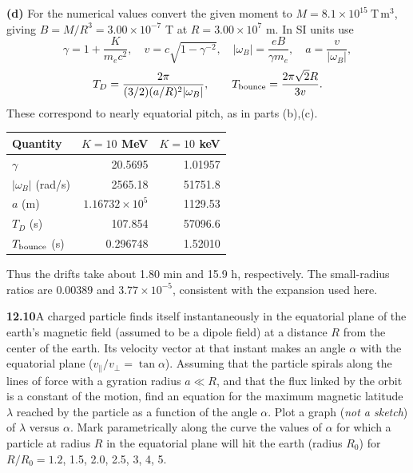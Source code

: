 \medskip\noindent\textbf{(d)} For the numerical values convert the given moment to
$M=8.1\times10^{15}\ \mathrm{T\,m^3}$, giving
$B=M/R^3=3.00\times10^{-7}$ T at $R=3.00\times10^7$ m.
In SI units use
\[
\gamma=1+\frac{K}{m_ec^2},\quad
v=c\sqrt{1-\gamma^{-2}},\quad
|\omega_B|=\frac{eB}{\gamma m_e},\quad a=\frac v{|\omega_B|},
\]
\[
T_D=\frac{2\pi}{(3/2)(a/R)^2|\omega_B|},\qquad
T_{\rm bounce}=\frac{2\pi\sqrt2R}{3v}.
\]
These correspond to nearly equatorial pitch, as in parts (b),(c).
\begin{center}
\begin{tabular}{lrr}
\toprule
Quantity&$K=10$ MeV&$K=10$ keV\\
\midrule
$\gamma$&20.5695&1.01957\\
$|\omega_B|$ (rad/s)&2565.18&51751.8\\
$a$ (m)&$1.16732\times10^5$&1129.53\\
$T_D$ (s)&107.854&57096.6\\
$T_{\rm bounce}$ (s)&0.296748&1.52010\\
\bottomrule
\end{tabular}
\end{center}
Thus the drifts take about 1.80 min and 15.9 h, respectively.
The small-radius ratios are $0.00389$ and $3.77\times10^{-5}$,
consistent with the expansion used here.

\par\bigskip
\noindent\textbf{12.10}\quad A charged particle finds itself instantaneously in the equatorial plane of the earth's magnetic field (assumed to be a dipole field) at a distance $R$ from the center of the earth. Its velocity vector at that instant makes an angle $\alpha$ with the equatorial plane ($v_{\parallel}/v_{\perp}=\tan\alpha$). Assuming that the particle spirals along the lines of force with a gyration radius $a\ll R$, and that the flux linked by the orbit is a constant of the motion, find an equation for the maximum magnetic latitude $\lambda$ reached by the particle as a function of the angle $\alpha$. Plot a graph (\emph{not a sketch}) of $\lambda$ versus $\alpha$. Mark parametrically along the curve the values of $\alpha$ for which a particle at radius $R$ in the equatorial plane will hit the earth (radius $R_{0}$) for $R/R_{0}=1.2$, 1.5, 2.0, 2.5, 3, 4, 5.
\solution

